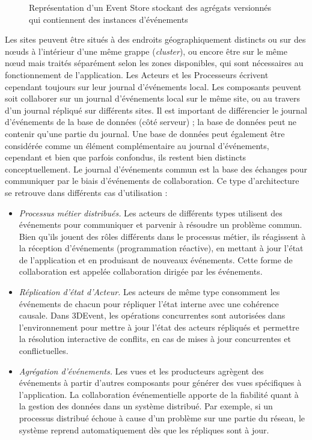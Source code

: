 \begin{figure}
	\centering
	\caption{Représentation d'un Event Store stockant des agrégats versionnés qui 
	contiennent des instances d'événements}
	\label{fig:event-store}
\end{figure}

Les sites peuvent être situés à des endroits géographiquement distincts ou sur 
des nœuds à l'intérieur d'une même grappe (\textit{cluster}), ou encore être sur le 
même nœud mais traités séparément selon les zones 
disponibles, qui sont nécessaires au fonctionnement de l'application. 
Les Acteurs et les Processeurs écrivent cependant toujours sur leur journal 
d'événements local. 
Les composants peuvent soit collaborer sur un journal d'événements local sur le 
même site, ou au travers d'un journal répliqué sur différents sites.
Il est important de différencier le journal d'événements de la base de données 
(côté serveur) ; la base de données peut ne contenir qu'une partie du journal. 
Une base de données peut également être considérée comme un élément 
complémentaire au journal d'événements, cependant et bien que parfois 
confondus, ils restent bien distincts conceptuellement.
Le journal d'événements commun est la base des échanges pour communiquer 
par le biais d'événements de collaboration. Ce type d'architecture se retrouve dans 
différents cas d'utilisation :
\begin{itemize}
	\item \textit{Processus métier distribués.} Les acteurs de différents types 
	utilisent des événements pour communiquer et parvenir à résoudre un problème 
	commun. Bien qu'ils jouent des rôles différents dans le processus métier, ils 
	réagissent à la réception d'événements (programmation réactive), en 
	mettant à jour l'état de l'application et en produisant de nouveaux événements. 
	Cette forme de collaboration est appelée collaboration dirigée par les 
	événements.
	\item\textit{Réplication d'état d'Acteur.} Les acteurs de même type consomment 
	les événements de chacun pour répliquer l'état interne avec une cohérence 
	causale. Dans 3DEvent, les opérations concurrentes sont autorisées dans 
	l'environnement pour mettre à jour l'état des acteurs répliqués et permettre la 
	résolution interactive de conflits, en cas de mises à jour concurrentes et 
	conflictuelles. 
	\item \textit{Agrégation d'événements.} Les vues et les producteurs agrègent des 
	événements à partir d'autres composants pour générer des vues spécifiques à 
	l'application.
	La collaboration événementielle apporte de la fiabilité quant à la gestion des 
	données dans un système distribué. Par exemple, si un processus distribué 
	échoue à cause d'un problème sur une partie du réseau, le système reprend 
	automatiquement dès que les répliques sont à jour.
\end{itemize}

